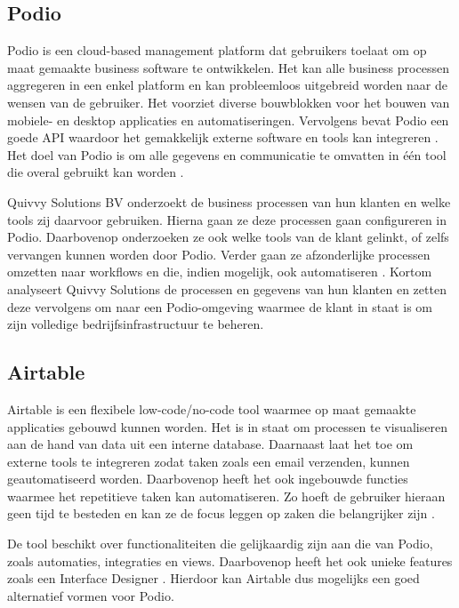 \subsection{Podio}

Podio is een cloud-based management platform dat gebruikers toelaat om op maat gemaakte business software te ontwikkelen. Het kan alle business processen aggregeren in een enkel platform en kan probleemloos uitgebreid worden naar de wensen van de gebruiker. Het voorziet diverse bouwblokken voor het bouwen van mobiele- en desktop applicaties en automatiseringen. Vervolgens bevat Podio een goede API waardoor het gemakkelijk externe software en tools kan integreren \autocite{QuivvyPodio}. Het doel van Podio is om alle gegevens en communicatie te omvatten in één tool die overal gebruikt kan worden \autocite{Podio}.  

Quivvy Solutions BV onderzoekt de business processen van hun klanten en welke tools zij daarvoor gebruiken. Hierna gaan ze deze processen gaan configureren in Podio. Daarbovenop onderzoeken ze ook welke tools van de klant gelinkt, of zelfs vervangen kunnen worden door Podio. Verder gaan ze afzonderlijke processen omzetten naar workflows en die, indien mogelijk, ook automatiseren \autocite{QuivvySoftware}. Kortom analyseert Quivvy Solutions de processen en gegevens van hun klanten en zetten deze vervolgens om naar een Podio-omgeving waarmee de klant in staat is om zijn volledige bedrijfsinfrastructuur te beheren.

\subsection{Airtable}

Airtable is een flexibele low-code/no-code tool waarmee op maat gemaakte applicaties gebouwd kunnen worden. Het is in staat om processen te visualiseren aan de hand van data uit een interne database. Daarnaast laat het toe om externe tools te integreren zodat taken zoals een email verzenden, kunnen geautomatiseerd worden. Daarbovenop heeft het ook ingebouwde functies waarmee het repetitieve taken kan automatiseren. Zo hoeft de gebruiker hieraan geen tijd te besteden en kan ze de focus leggen op zaken die belangrijker zijn \autocite{Airtable}.

De tool beschikt over functionaliteiten die gelijkaardig zijn aan die van Podio, zoals automaties, integraties en views. Daarbovenop heeft het ook unieke features zoals een Interface Designer \autocite{Airtable}. Hierdoor kan Airtable dus mogelijks een goed alternatief vormen voor Podio.


